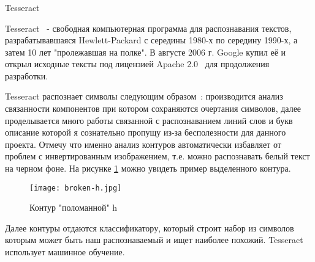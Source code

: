 \subsubsection{}
\label{sub:domain:recognition:tesseract}
Tesseract 

Tesseract~\cite{teseract} - свободная компьютерная программа для распознавания текстов, разрабатывавшаяся Hewlett-Packard с середины 1980-х по середину 1990-х, а затем 10 лет "пролежавшая на полке". В августе 2006 г. Google купил её и открыл исходные тексты под лицензией Apache 2.0~\cite{apache20} для продолжения разработки. 

Tesseract распознает символы следующим образом~\cite{tesseract_owerview}: производится анализ связанности компонентов при котором сохраняются очертания символов, далее проделывается много работы связанной с распознаванием линий слов и букв описание которой я сознательно пропущу из-за бесполезности для данного проекта. Отмечу что именно анализ контуров автоматически избавляет от проблем с инвертированным изображением, т.е. можно распознавать белый текст на черном фоне. На рисунке \ref{fig:domain:recognition:tesseract:hcountor} можно увидеть пример выделенного контура.
\begin{figure}[ht] 
    \centering
    \texttt{[image: broken-h.jpg]}  
    \caption{Контур "поломанной" h}
    \label{fig:domain:recognition:tesseract:hcountor}
  \end{figure}
Далее контуры отдаются классификатору, который строит набор из символов которым может быть наш распознаваемый и ищет наиболее похожий. Tesseract использует машинное обучение.

